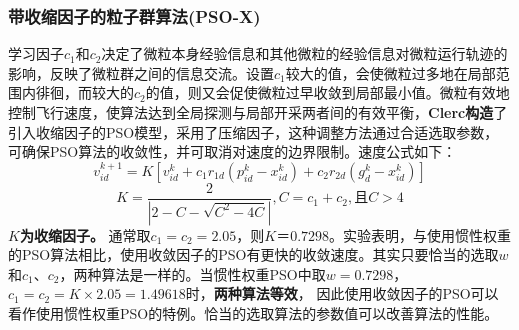 \documentclass[UTF8]{ctexart}
\begin{document}
\subsubsection{带收缩因子的粒子群算法(PSO-X)}
学习因子$c_1$和$c_2$决定了微粒本身经验信息和其他微粒的经验信息对微粒运行轨迹的影响，反映了微粒群之间的信息交流。设置$c_1$较大的值，会使微粒过多地在局部范围内徘徊，而较大的$c_2$的值，则又会促使微粒过早收敛到局部最小值。微粒有效地控制飞行速度，使算法达到全局探测与局部开采两者间的有效平衡，\textbf{Clerc构造}了引入收缩因子的PSO模型，采用了压缩因子，这种调整方法通过合适选取参数，可确保PSO算法的收敛性，并可取消对速度的边界限制。速度公式如下：
$$ v_{id}^{k+1}=K\left[ v_{id}^{k}+c_1r_{1d}\left( p_{id}^{k}-x_{id}^{k}\right) + c_2r_{2d}\left( g_{d}^{k}-x_{id}^{k}\right)\right] $$
$$ K=\frac{2}{\left|2-C-\sqrt{C^2-4C}\right|},C=c_1+c_2,且C>4 $$
\textbf{$K$为收缩因子。} 通常取$c_1 = c_2 = 2.05$，则$K＝0.7298$。实验表明，与使用惯性权重的PSO算法相比，使用收敛因子的PSO有更快的收敛速度。其实只要恰当的选取$w$和$c_1、c_2$，两种算法是一样的。当惯性权重PSO中取$w = 0.7298$，$c_1 = c_2 = K \times 2.05 = 1.49618$时，\textbf{两种算法等效}， 因此使用收敛因子的PSO可以看作使用惯性权重PSO的特例。恰当的选取算法的参数值可以改善算法的性能。
 
\end{document}

